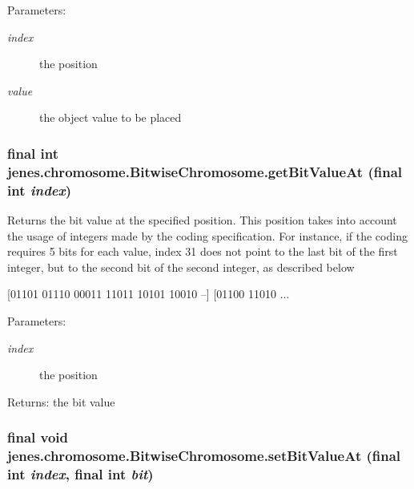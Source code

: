 \begin{Desc}
\item[Parameters:]
\begin{description}
\item[{\em index}]the position \item[{\em value}]the object value to be placed \end{description}
\end{Desc}
\hypertarget{classjenes_1_1chromosome_1_1_bitwise_chromosome_05ce80f3729d007c5d550eef5969ac86}{
\subsubsection[getBitValueAt]{\setlength{\rightskip}{0pt plus 5cm}final int jenes.chromosome.BitwiseChromosome.getBitValueAt (final int {\em index})}}
\label{classjenes_1_1chromosome_1_1_bitwise_chromosome_05ce80f3729d007c5d550eef5969ac86}


Returns the bit value at the specified position. This position takes into account the usage of integers made by the coding specification. For instance, if the coding requires 5 bits for each value, index 31 does not point to the last bit of the first integer, but to the second bit of the second integer, as described below

\mbox{[}01101 01110 00011 11011 10101 10010 --\mbox{]} \mbox{[}01100 11010 ...

\begin{Desc}
\item[Parameters:]
\begin{description}
\item[{\em index}]the position \end{description}
\end{Desc}
\begin{Desc}
\item[Returns:]the bit value \end{Desc}
\hypertarget{classjenes_1_1chromosome_1_1_bitwise_chromosome_2e746b511933914d4be452573ac5ab7c}{
\subsubsection[setBitValueAt]{\setlength{\rightskip}{0pt plus 5cm}final void jenes.chromosome.BitwiseChromosome.setBitValueAt (final int {\em index}, \/  final int {\em bit})}}
\label{classjenes_1_1chromosome_1_1_bitwise_chromosome_2e746b511933914d4be452573ac5ab7c}


